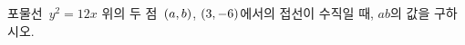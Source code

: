 포물선~$y^2=12x$ 위의 두 점~$(a{,}\mkern3mu\mathopen{}b)$, $(3{,}\mkern3mu\mathopen{}-6)$에서의 접선이 수직일 때, $ab$의 값을 구하시오.
